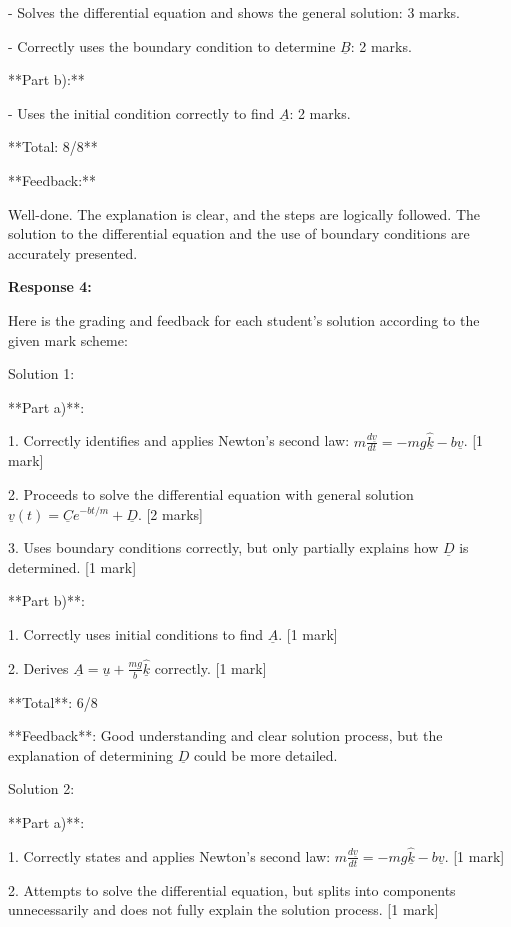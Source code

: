 \documentclass[a4paper,11pt]{article}
\begin{document}
- Solves the differential equation and shows the general solution: 3 marks.

- Correctly uses the boundary condition to determine \( \underline{B} \): 2 marks.

**Part b):**

- Uses the initial condition correctly to find \( \underline{A} \): 2 marks.

**Total: 8/8**

**Feedback:**

Well-done. The explanation is clear, and the steps are logically followed. The solution to the differential equation and the use of boundary conditions are accurately presented.

\bigskip
\textbf{Response 4:}

Here is the grading and feedback for each student's solution according to the given mark scheme:

Solution 1:

**Part a)**: 

1. Correctly identifies and applies Newton's second law: \( m\frac{d\underline{v}}{dt} = - mg \hat{\underline{k}} - b\underline{v} \). [1 mark]

2. Proceeds to solve the differential equation with general solution \( \underline{v}(t) = \underline{C}e^{-bt/m} + \underline{D} \). [2 marks]

3. Uses boundary conditions correctly, but only partially explains how \(\underline{D}\) is determined. [1 mark]

**Part b)**:

1. Correctly uses initial conditions to find \( \underline{A} \). [1 mark]

2. Derives \( \underline{A} = \underline{u} + \frac{mg}{b} \hat{\underline{k}} \) correctly. [1 mark]

**Total**: 6/8

**Feedback**: Good understanding and clear solution process, but the explanation of determining \(\underline{D}\) could be more detailed.

Solution 2:

**Part a)**:

1. Correctly states and applies Newton's second law: \( m\frac{d\underline{v}}{dt} = - mg \hat{\underline{k}} - b\underline{v} \). [1 mark]

2. Attempts to solve the differential equation, but splits into components unnecessarily and does not fully explain the solution process. [1 mark]
\end{document}
